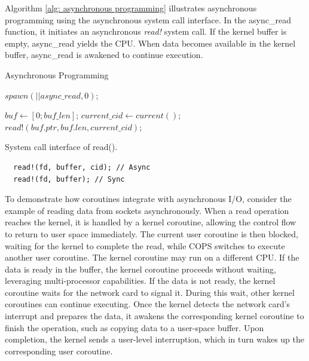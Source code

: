 \documentclass[conference]{IEEEtran}
\begin{document}
Algorithm \ref{alg: asynchronous programming} illustrates asynchronous programming using the asynchronous system call interface. In the async\_read function, it initiates an asynchronous \textit{read!} system call. If the kernel buffer is empty, async\_read yields the CPU. When data becomes available in the kernel buffer, async\_read is awakened to continue execution.

\begin{algorithm}[!ht]
  \caption{Asynchronous Programming}
  \label{alg: asynchronous programming}
  \begin{algorithmic}[1]
      \State $spawn(|| async\_read, 0)$;
		\EndFunction

      \State $buf \gets [0; buf\_len]$;
      \State $current\_cid \gets current()$;
      \State $read!(buf.ptr, buf.len, current\_cid)$;
    \EndFunction
  \end{algorithmic}
\end{algorithm}

\begin{listing}
  \caption{System call interface of read().}
  \label{listing: system call}
  \begin{mdframed}
  \begin{verbatim}
  read!(fd, buffer, cid); // Async
  read!(fd, buffer); // Sync
  \end{verbatim}
  \end{mdframed}
\end{listing}


To demonstrate how coroutines integrate with asynchronous I/O, consider the example of reading data from sockets asynchronously. When a read operation reaches the kernel, it is handled by a kernel coroutine, allowing the control flow to return to user space immediately. The current user coroutine is then blocked, waiting for the kernel to complete the read, while COPS switches to execute another user coroutine. The kernel coroutine may run on a different CPU. If the data is ready in the buffer, the kernel coroutine proceeds without waiting, leveraging multi-processor capabilities. If the data is not ready, the kernel coroutine waits for the network card to signal it. During this wait, other kernel coroutines can continue executing. Once the kernel detects the network card's interrupt and prepares the data, it awakens the corresponding kernel coroutine to finish the operation, such as copying data to a user-space buffer. Upon completion, the kernel sends a user-level interruption, which in turn wakes up the corresponding user coroutine.
\end{document}
